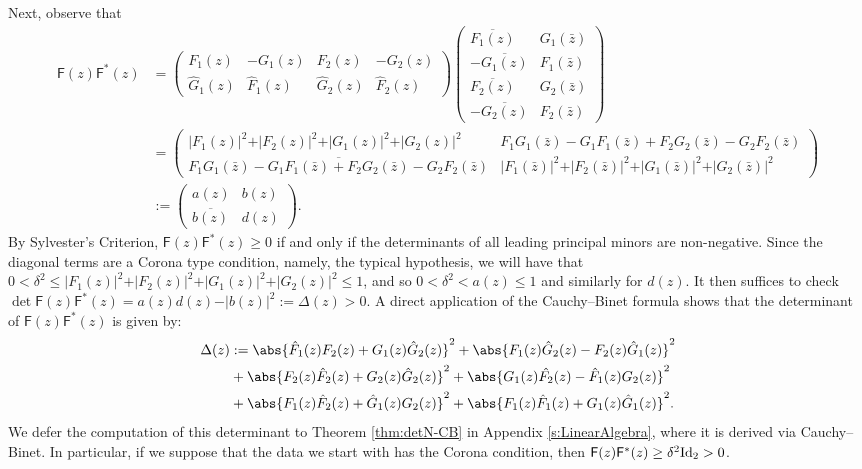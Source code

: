 \documentclass[11pt]{amsart}
\begin{document}
Next, observe that
\begin{align*}
\mathsf{F}(z)\mathsf{F}^{\ast}(z) & =
\left(
\begin{array}{cccc}
F_1(z) & -G_1(z) & F_2(z) & -G_2(z) \\
\hat G_1(z) & \hat F_1(z) & \hat G_2(z) & \hat F_2(z)
\end{array}
\right)
\left(
\begin{array}{cc}
\overline{F_1(z)} & G_1(\bar z) \\
-\overline{G_1(z)} & F_1(\bar z) \\
\overline{F_2(z)} & G_2(\bar z) \\
-\overline{G_2(z)} & F_2(\bar z)
\end{array}
\right)\\
& = {
\left(\begin{array}{cc}
\vert F_1(z)\vert^2+\vert F_2(z)\vert^2 +\vert G_1(z)\vert^2+\vert G_2(z)\vert^2 & F_1 G_1(\bar z) - G_1 F_1(\bar z) + F_2 G_2(\bar z) - G_2 F_2(\bar z) \\
\overline{F_1 G_1(\bar z) - G_1 F_1(\bar z) + F_2 G_2(\bar z) - G_2 F_2(\bar z)} & \vert F_1(\bar z)\vert^2+\vert F_2(\bar z)\vert^2 +\vert G_1(\bar z)\vert^2+\vert G_2(\bar z)\vert^2
\end{array}
\right)}\\
& :=
\left(\begin{array}{cc}
a(z) & b(z)\\
\overline{b(z)} & d(z)
\end{array}
\right).
\end{align*}
By Sylvester's Criterion, $\mathsf{F}(z)\mathsf{F}^{\ast}(z)\geq 0$ if and only if the determinants of all leading principal minors are non-negative.  Since the diagonal terms are a Corona type condition, namely, the typical hypothesis, we will have that $0<\delta^2\leq\vert F_1(z)\vert^2+\vert F_2(z)\vert^2 +\vert G_1(z)\vert^2+\vert G_2(z)\vert^2\leq 1$, and so $0<\delta^2<a(z)\leq 1$ and similarly for $d(z)$.  It then suffices to check $\det \mathsf{F}(z)\mathsf{F}^{\ast}(z)=a(z)d(z)-\vert b(z)\vert^2:=\Delta(z)> 0$.  A direct application of the Cauchy--Binet formula shows that the determinant of $\mathsf{F}(z)\mathsf{F}^{\ast}(z)$ is given by:
\begin{align}
\label{e:NewDenominator}
\Delta(z) & :=\abs{\hat{F}_1(z)F_2(z)+G_1(z)\hat{G}_2(z)}^2+\abs{F_1(z)\hat{G}_2(z)-F_2(z)\hat{G}_1(z)}^2
\\
&
+
\abs{F_2(z)\hat{F}_2(z)+G_2(z)\hat{G}_2(z)}^2
+\abs{G_1(z)\hat{F_2}(z)-\hat{F}_1(z)G_2(z)}^2
\notag\\
&
+\abs{F_1(z)\hat{F}_2(z)+\hat{G}_1(z)G_2(z)}^2+\abs{F_1(z)\hat{F}_1(z)+G_1(z)\hat{G}_1(z)}^2.\notag
\end{align}
We defer the computation of this determinant to Theorem \ref{thm:detN-CB} in Appendix \ref{s:LinearAlgebra}, where it is derived via Cauchy--Binet.  In particular, if we suppose that the data we start with has the Corona condition, then $\mathsf{F}(z)\mathsf{F}^*(z)\geq \delta^2\textnormal{Id}_2>0$.
\end{document}
